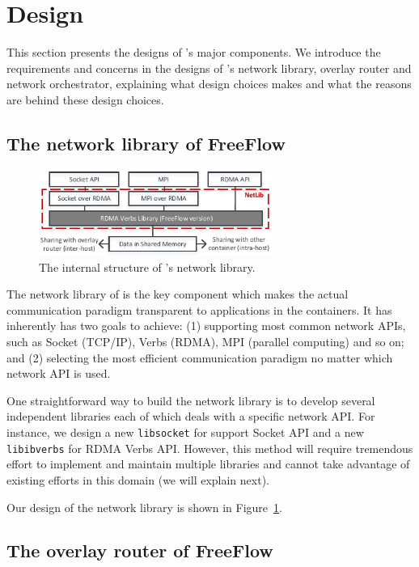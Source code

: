 \section{Design} \label{sec:design}

This section presents the designs of \sysname's major components. We introduce
the requirements and concerns in the designs of \sysname's network library, overlay router and network orchestrator, explaining what design choices 
\sysname makes and what the reasons are behind these design choices.

\subsection{The network library of FreeFlow}

\begin{figure}[t!] 
     \centering 
     \includegraphics[width=3.0in]{figures/netlib.pdf} 
    \caption{\label{fig:netlib} The internal structure of \sysname's network library.} 
\end{figure} 

The network library of \sysname is the key component which makes
the actual communication paradigm transparent to applications in the containers.
It has inherently has two goals to achieve: (1) supporting most common network
APIs, such as Socket (TCP/IP), Verbs (RDMA), MPI (parallel computing) and so on;
and (2) selecting the most efficient communication paradigm no matter which network API is used. 

One straightforward way to build the network library is to develop several
independent libraries each of which deals with a specific network API. 
For instance, we design a new \texttt{libsocket} for support Socket API and 
a new \texttt{libibverbs} for RDMA Verbs API. However, this method will require
tremendous effort to implement and maintain multiple libraries and cannot take
advantage of existing efforts in this domain (we will explain next).

Our design of the network library is shown in Figure~\ref{fig:netlib}. 

\subsection{The overlay router of FreeFlow}

